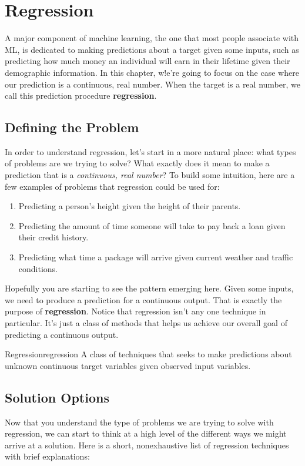 \chapter{Regression}
A major component of machine learning, the one that most people associate with ML, is dedicated to making predictions about a target given some inputs, such as predicting how much money an individual will earn in their lifetime given their demographic information. In this chapter, w!e're going to focus on the case where our prediction is a continuous, real number. When the target is a real number, we call this prediction procedure \textbf{regression}.

\section{Defining the Problem}
In order to understand regression, let's start in a more natural place: what types of problems are we trying to solve? What exactly does it mean to make a prediction that is a \textit{continuous, real number}? To build some intuition, here are a few examples of problems that regression could be used for:

\begin{enumerate}
    \item Predicting a person's height given the height of their parents.
    \item Predicting the amount of time someone will take to pay back a loan given their credit history.
    \item Predicting what time a package will arrive given current weather and traffic conditions.
\end{enumerate}

Hopefully you are starting to see the pattern emerging here. Given some inputs, we need to produce a prediction for a continuous output. That is exactly the purpose of \textbf{regression}. Notice that regression isn't any one technique in particular. It's just a class of methods that helps us achieve our overall goal of predicting a continuous output.

\begin{definition}{Regression}{regression}
A class of techniques that seeks to make predictions about unknown continuous target variables given observed input variables.
\end{definition}

\section{Solution Options}
Now that you understand the type of problems we are trying to solve with regression, we can start to think at a high level of the different ways we might arrive at a solution. Here is a short, nonexhaustive list of regression techniques with brief explanations:


